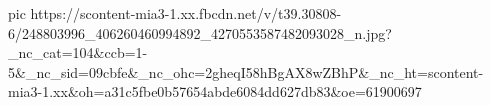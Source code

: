  
 
 
 
 

\ifcmt
  pic https://scontent-mia3-1.xx.fbcdn.net/v/t39.30808-6/248803996_406260460994892_4270553587482093028_n.jpg?_nc_cat=104&ccb=1-5&_nc_sid=09cbfe&_nc_ohc=2gheqI58hBgAX8wZBhP&_nc_ht=scontent-mia3-1.xx&oh=a31c5fbe0b57654abde6084dd627db83&oe=61900697
\fi
